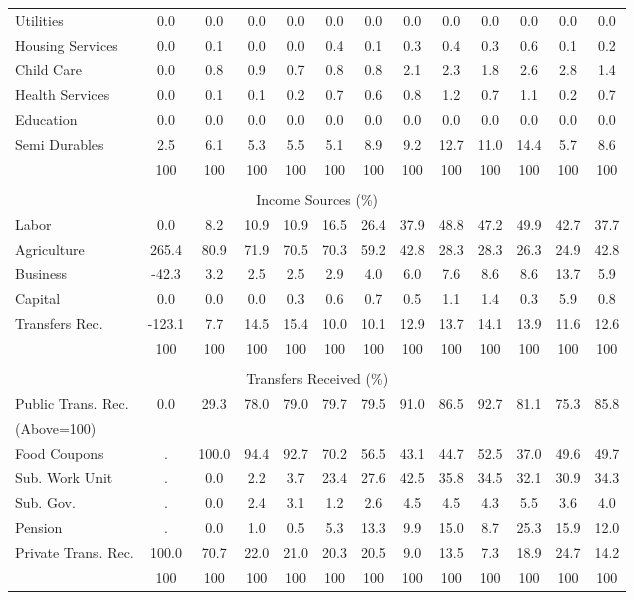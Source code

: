 \begin{tabular}{l c c c| c c c c c| c c c| c}
Utilities    & 0.0 & 0.0 & 0.0 & 0.0 & 0.0 & 0.0 & 0.0 & 0.0 & 0.0 & 0.0 & 0.0 & 0.0 \\
Housing Services  & 0.0 & 0.1 & 0.0 & 0.0 & 0.4 & 0.1 & 0.3 & 0.4 & 0.3 & 0.6 & 0.1 & 0.2 \\
Child Care   & 0.0 & 0.8 & 0.9 & 0.7 & 0.8 & 0.8 & 2.1 & 2.3 & 1.8 & 2.6 & 2.8 & 1.4 \\
Health Services    & 0.0 & 0.1 & 0.1 & 0.2 & 0.7 & 0.6 & 0.8 & 1.2 & 0.7 & 1.1 & 0.2 & 0.7 \\
Education   & 0.0 & 0.0 & 0.0 & 0.0 & 0.0 & 0.0 & 0.0 & 0.0 & 0.0 & 0.0 & 0.0 & 0.0 \\
Semi Durables     & 2.5 & 6.1 & 5.3 & 5.5 & 5.1 & 8.9 & 9.2 & 12.7 & 11.0 & 14.4 & 5.7 & 8.6 \\
\midrule
 & 100 & 100 & 100 & 100 & 100 & 100 & 100 & 100 & 100 & 100 & 100 & 100 \\
\midrule \\
\multicolumn{13}{c}{Income Sources (\%)}  \\
\midrule
Labor        & 0.0 & 8.2 & 10.9 & 10.9 & 16.5 & 26.4 & 37.9 & 48.8 & 47.2 & 49.9 & 42.7 & 37.7 \\
Agriculture  & 265.4 & 80.9 & 71.9 & 70.5 & 70.3 & 59.2 & 42.8 & 28.3 & 28.3 & 26.3 & 24.9 & 42.8 \\
Business     & -42.3 & 3.2 & 2.5 & 2.5 & 2.9 & 4.0 & 6.0 & 7.6 & 8.6 & 8.6 & 13.7 & 5.9 \\
Capital      & 0.0 & 0.0 & 0.0 & 0.3 & 0.6 & 0.7 & 0.5 & 1.1 & 1.4 & 0.3 & 5.9 & 0.8 \\
Transfers Rec.  & -123.1 & 7.7 & 14.5 & 15.4 & 10.0 & 10.1 & 12.9 & 13.7 & 14.1 & 13.9 & 11.6 & 12.6 \\
\midrule
 & 100 & 100 & 100 & 100 & 100 & 100 & 100 & 100 & 100 & 100 & 100 & 100 \\
\midrule \\
\multicolumn{13}{c}{Transfers Received (\%)}  \\
\midrule
Public Trans. Rec.  & 0.0 & 29.3 & 78.0 & 79.0 & 79.7 & 79.5 & 91.0 & 86.5 & 92.7 & 81.1 & 75.3 & 85.8 \\
(Above=100) & & & & & & & & & & & &  \\
\hspace{.3cm} Food Coupons    & . & 100.0 & 94.4 & 92.7 & 70.2 & 56.5 & 43.1 & 44.7 & 52.5 & 37.0 & 49.6 & 49.7 \\
\hspace{.3cm} Sub. Work Unit  & . & 0.0 & 2.2 & 3.7 & 23.4 & 27.6 & 42.5 & 35.8 & 34.5 & 32.1 & 30.9 & 34.3 \\
\hspace{.3cm} Sub. Gov.       & . & 0.0 & 2.4 & 3.1 & 1.2 & 2.6 & 4.5 & 4.5 & 4.3 & 5.5 & 3.6 & 4.0 \\
\hspace{.3cm} Pension         & . & 0.0 & 1.0 & 0.5 & 5.3 & 13.3 & 9.9 & 15.0 & 8.7 & 25.3 & 15.9 & 12.0 \\
Private Trans. Rec. & 100.0 & 70.7 & 22.0 & 21.0 & 20.3 & 20.5 & 9.0 & 13.5 & 7.3 & 18.9 & 24.7 & 14.2 \\
\midrule
 & 100 & 100 & 100 & 100 & 100 & 100 & 100 & 100 & 100 & 100 & 100 & 100 \\
\bottomrule
\end{tabular}